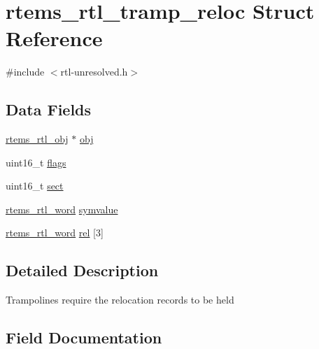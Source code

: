\hypertarget{structrtems__rtl__tramp__reloc}{}\section{rtems\+\_\+rtl\+\_\+tramp\+\_\+reloc Struct Reference}
\label{structrtems__rtl__tramp__reloc}


{\ttfamily \#include $<$rtl-\/unresolved.\+h$>$}

\subsection*{Data Fields}
\begin{DoxyCompactItemize}
\item 
\mbox{\hyperlink{structrtems__rtl__obj}{rtems\+\_\+rtl\+\_\+obj}} $\ast$ \mbox{\hyperlink{structrtems__rtl__tramp__reloc_a622644fd5459b422f266363527cdbfd4}{obj}}
\item 
uint16\+\_\+t \mbox{\hyperlink{structrtems__rtl__tramp__reloc_a72f188740df5ddc3581d07afe824f060}{flags}}
\item 
uint16\+\_\+t \mbox{\hyperlink{structrtems__rtl__tramp__reloc_a419989d6690a80af88128dc1eb57bf47}{sect}}
\item 
\mbox{\hyperlink{rtl-unresolved_8h_a5ab1ca8c94e49686f84f5ccf0731f0e6}{rtems\+\_\+rtl\+\_\+word}} \mbox{\hyperlink{structrtems__rtl__tramp__reloc_a3c7d02b7a0d995fa4d4ab81d8c82ab34}{symvalue}}
\item 
\mbox{\hyperlink{rtl-unresolved_8h_a5ab1ca8c94e49686f84f5ccf0731f0e6}{rtems\+\_\+rtl\+\_\+word}} \mbox{\hyperlink{structrtems__rtl__tramp__reloc_aa920c68e03aabbf4fdb6c6f27a2c088a}{rel}} \mbox{[}3\mbox{]}
\end{DoxyCompactItemize}


\subsection{Detailed Description}
Trampolines require the relocation records to be held 

\subsection{Field Documentation}
\mbox{\label{structrtems__rtl__tramp__reloc_a72f188740df5ddc3581d07afe824f060}} 
